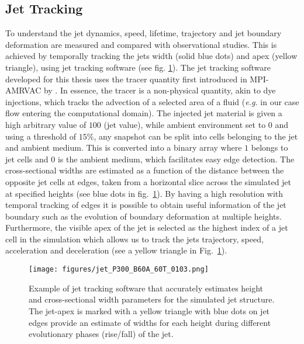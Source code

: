 \documentclass[12pt]{ociamthesis}
\newcommand{\fref}[1]{fig. \ref{#1}}
\begin{document}
\subsection{Jet Tracking}
\label{subsec:jet_tracking}
To understand the jet dynamics, speed, lifetime, trajectory and jet boundary deformation are measured and compared with observational studies. This is achieved by temporally tracking the jets width (solid blue dots) and apex (yellow triangle), using jet tracking software (see \fref{jet_tracker}). The jet tracking software developed for this thesis uses the tracer quantity first introduced in MPI-AMRVAC by \cite{Porth_2014}. In essence, the tracer is a non-physical quantity, akin to dye injections, which tracks the advection of a selected area of a fluid (\textit{e.g.} in our case flow entering the computational domain). The injected jet material is given a high arbitrary value of $100$ (jet value), while ambient environment set to 0 and using a threshold of $15\%$, any snapshot can be split into cells belonging to the jet and ambient medium. This is converted into a binary array where $1$ belongs to jet cells and $0$ is the ambient medium, which facilitates easy edge detection. The cross-sectional widths are estimated as a function of the distance between the opposite jet cells at edges, taken from a horizontal slice across the simulated jet at specified heights (see blue dots in fig.~\ref{jet_tracker}). By having a high resolution with temporal tracking of edges it is possible to obtain useful information of the jet boundary such as the evolution of boundary deformation at multiple heights. Furthermore, the visible apex of the jet is selected as the highest index of a jet cell in the simulation which allows us to track the jets trajectory, speed, acceleration and deceleration (see a yellow triangle in Fig.~\ref{jet_tracker}).
\begin{figure}
\centering
{\texttt{[image: figures/jet\_P300\_B60A\_60T\_0103.png]}}
\caption{Example of jet tracking software that accurately estimates height and cross-sectional width parameters for the simulated jet structure. The jet-apex is marked with a yellow triangle with blue dots on jet edges provide an estimate of widths for each height during different evolutionary phases (rise/fall) of the jet.}
\label{jet_tracker}
\end{figure}
\end{document}
